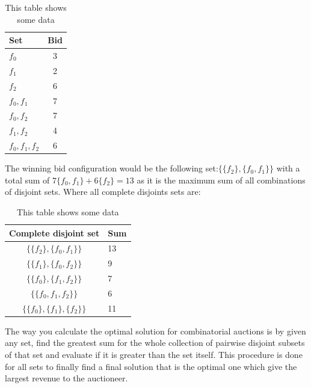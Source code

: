 \documentclass[a4paper, 12pt]{report}
\begin{document}
\begin{table}[htb]
\centering
\begin{tabular}{ l | c}
\hline  
Set & Bid \\
\hline
$f_0$ & 3 \\
$f_1$ & 2 \\
$f_2$ & 6 \\
$f_0, f_1$ & 7 \\
$f_0, f_2$ & 7 \\
$f_1, f_2$ & 4 \\
$f_0, f_1, f_2$ & 6 \\
\end{tabular}
\caption{This table shows some data}
\label{tab:bids}
\end{table}
The winning bid configuration would be the following set:$
\{\{f_2\},\{f_0 , f_1\}\}$ 
with a total sum of $7 \{f_0 , f_1\}+6 \{f_2\} = 13$ as it
is the maximum sum of all combinations of disjoint sets. Where all complete
disjoints sets are:

\begin{table}[htb]
\centering
\begin{tabular}{c | l }
\hline
Complete disjoint set & Sum\\
\hline
$\{\{f_2 \},\{f_0 , f_1 \}\} $ & 13 \\
$\{\{f_1 \},\{f_0 , f_2 \}\} $ & 9 \\
$\{\{f_0 \},\{f_1 , f_2 \}\} $ & 7 \\

$\{\{f_0,f_1 , f_2 \}\} $ & 6 \\
$\{\{f_0 \},\{f_1 \}, \{ f_2 \}\} $ &  11
\end{tabular}
\caption{This table shows some data}
\label{tab:disjoint}
\end{table}

The way you calculate the optimal solution for combinatorial auctions is by
given any set, 
find the greatest sum for the whole collection of pairwise disjoint subsets of
that set and evaluate if it is greater than the set itself.
This procedure is done for all sets to finally find a final solution that is the
optimal one which give the largest revenue to the auctioneer.
\end{document}
